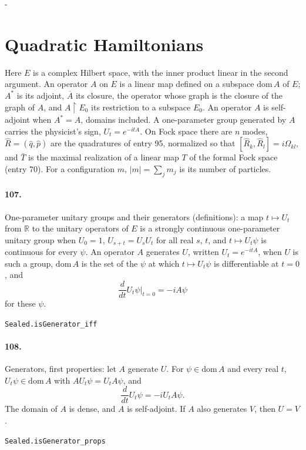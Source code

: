 \documentclass[11pt]{article}
\makeatletter
\newcommand{\keepspace}[1]{\par\penalty-100\begingroup\setlength{\dimen@}{#1}\dimen@ii\pagegoal\advance\dimen@ii-\pagetotal\ifdim\dimen@>\dimen@ii\ifdim\dimen@ii>\z@\vfil\fi\break\fi\endgroup}
\makeatother
\begin{document}
\keepspace{14\baselineskip}\section*{Quadratic Hamiltonians}
Here $E$ is a complex Hilbert space, with the inner product linear in the second argument. An operator $A$ on $E$ is a linear map defined on a subspace $\mathrm{dom}\, A$ of $E$; $A^*$ is its adjoint, $\overline A$ its closure, the operator whose graph is the closure of the graph of $A$, and $A \restriction E_0$ its restriction to a subspace $E_0$. An operator $A$ is self-adjoint when $A^* = A$, domains included. A one-parameter group generated by $A$ carries the physicist's sign, $U_t = e^{-itA}$. On Fock space there are $n$ modes, $\hat R = (\hat q, \hat p)$ are the quadratures of entry 95, normalized so that $[\hat R_k, \hat R_l] = i\Omega_{kl}$, and $\bar T$ is the maximal realization of a linear map $T$ of the formal Fock space (entry 70). For a configuration $m$, $|m| = \sum_j m_j$ is its number of particles.

\paragraph{107.} One-parameter unitary groups and their generators (definitions): a map $t \mapsto U_t$ from $\mathbb R$ to the unitary operators of $E$ is a strongly continuous one-parameter unitary group when $U_0 = 1$, $U_{s+t} = U_s U_t$ for all real $s$, $t$, and $t \mapsto U_t\psi$ is continuous for every $\psi$. An operator $A$ generates $U$, written $U_t = e^{-itA}$, when $U$ is such a group, $\mathrm{dom}\, A$ is the set of the $\psi$ at which $t \mapsto U_t\psi$ is differentiable at $t = 0$, and \[\frac{d}{dt} U_t\psi\big|_{t=0} = -iA\psi\] for these $\psi$.\par{\footnotesize\texttt{Sealed.isGenerator\_iff}}

\paragraph{108.} Generators, first properties: let $A$ generate $U$. For $\psi \in \mathrm{dom}\, A$ and every real $t$, $U_t\psi \in \mathrm{dom}\, A$ with $AU_t\psi = U_tA\psi$, and \[\frac{d}{dt} U_t\psi = -iU_tA\psi.\] The domain of $A$ is dense, and $A$ is self-adjoint. If $A$ also generates $V$, then $U = V$.\par{\footnotesize\texttt{Sealed.isGenerator\_props}}
\end{document}
